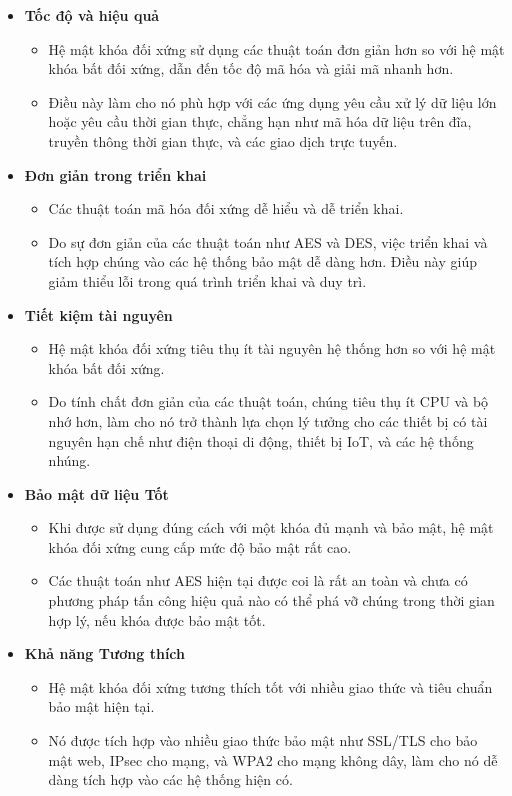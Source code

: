 \begin{itemize}
    \item \textbf{Tốc độ và hiệu quả}
    \begin{itemize}
        \item  Hệ mật khóa đối xứng sử dụng các thuật toán đơn giản hơn so với hệ mật khóa bất đối xứng, dẫn đến tốc độ mã hóa và giải mã nhanh hơn.
        \item  Điều này làm cho nó phù hợp với các ứng dụng yêu cầu xử lý dữ liệu lớn hoặc yêu cầu thời gian thực, chẳng hạn như mã hóa dữ liệu trên đĩa, truyền thông thời gian thực, và các giao dịch trực tuyến.
    \end{itemize}

    \item \textbf{Đơn giản trong triển khai}
    \begin{itemize}
        \item Các thuật toán mã hóa đối xứng dễ hiểu và dễ triển khai.
        \item Do sự đơn giản của các thuật toán như AES và DES, việc triển khai và tích hợp chúng vào các hệ thống bảo mật dễ dàng hơn. Điều này giúp giảm thiểu lỗi trong quá trình triển khai và duy trì.
    \end{itemize}

    \item \textbf{Tiết kiệm tài nguyên}
    \begin{itemize}
        \item Hệ mật khóa đối xứng tiêu thụ ít tài nguyên hệ thống hơn so với hệ mật khóa bất đối xứng.
        \item  Do tính chất đơn giản của các thuật toán, chúng tiêu thụ ít CPU và bộ nhớ hơn, làm cho nó trở thành lựa chọn lý tưởng cho các thiết bị có tài nguyên hạn chế như điện thoại di động, thiết bị IoT, và các hệ thống nhúng.
    \end{itemize}

    \item \textbf{Bảo mật dữ liệu Tốt}
    \begin{itemize}
        \item Khi được sử dụng đúng cách với một khóa đủ mạnh và bảo mật, hệ mật khóa đối xứng cung cấp mức độ bảo mật rất cao.
        \item  Các thuật toán như AES hiện tại được coi là rất an toàn và chưa có phương pháp tấn công hiệu quả nào có thể phá vỡ chúng trong thời gian hợp lý, nếu khóa được bảo mật tốt.\cite{agrawal2012comparative}
    \end{itemize}

    \item \textbf{Khả năng Tương thích}
    \begin{itemize}
        \item  Hệ mật khóa đối xứng tương thích tốt với nhiều giao thức và tiêu chuẩn bảo mật hiện tại.
        \item  Nó được tích hợp vào nhiều giao thức bảo mật như SSL/TLS cho bảo mật web, IPsec cho mạng, và WPA2 cho mạng không dây, làm cho nó dễ dàng tích hợp vào các hệ thống hiện có.
    \end{itemize}
\end{itemize}

